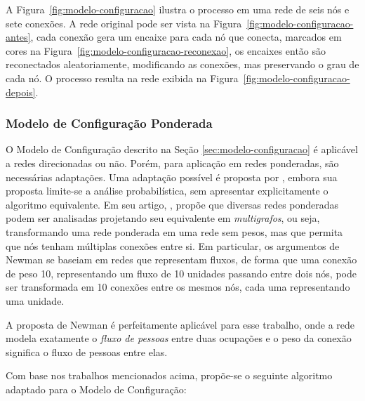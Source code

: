 \documentclass[12pt,a4paper]{article}
\theoremstyle{hypo}
\begin{document}
A Figura~\ref{fig:modelo-configuracao} ilustra o processo em uma rede de seis nós e sete conexões. A rede original pode ser vista na Figura~\ref{fig:modelo-configuracao-antes}, cada conexão gera um encaixe para cada nó que conecta, marcados em cores na Figura~\ref{fig:modelo-configuracao-reconexao}, os encaixes então são reconectados aleatoriamente, modificando as conexões, mas preservando o grau de cada nó. O processo resulta na rede exibida na Figura~\ref{fig:modelo-configuracao-depois}.


\subsubsection{Modelo de Configuração Ponderada} \label{sec:modelo-configuracao-ponderada}

O Modelo de Configuração descrito na Seção \ref{sec:modelo-configuracao} é aplicável a redes direcionadas ou não. Porém, para aplicação em redes ponderadas, são necessárias adaptações. Uma adaptação possível é proposta por , embora sua proposta limite-se a análise probabilística, sem apresentar explicitamente o algoritmo equivalente. Em seu artigo, , propõe que diversas redes ponderadas podem ser analisadas projetando seu equivalente em \textit{multigrafos}, ou seja, transformando uma rede ponderada em uma rede sem pesos, mas que permita que nós tenham múltiplas conexões entre si. Em particular, os argumentos de Newman se baseiam em redes que representam fluxos, de forma que uma conexão de peso 10, representando um fluxo de 10 unidades passando entre dois nós, pode ser transformada em 10 conexões entre os mesmos nós, cada uma representando uma unidade.

A proposta de Newman é perfeitamente aplicável para esse trabalho, onde a rede modela exatamente o \textit{fluxo de pessoas} entre duas ocupações e o peso da conexão significa o fluxo de pessoas entre elas.

Com base nos trabalhos mencionados acima, propõe-se o seguinte algoritmo adaptado para o Modelo de Configuração:
\end{document}
